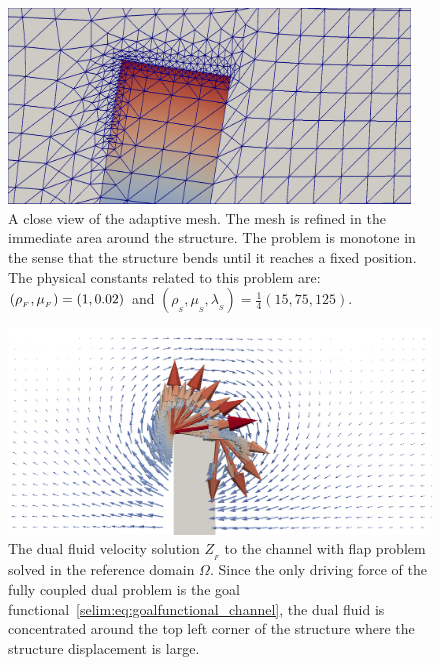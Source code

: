 \begin{figure}
  \label{selim:fig:channel_zoom_mesh}
  \caption{A close view of the adaptive mesh. The mesh is refined in
    the immediate area around the structure. The problem is monotone
    in the sense that the structure bends until it reaches a fixed
    position. The physical constants related to this problem are:
    $(\rho_{_{F}},\mu_{_{F}}) = (1, 0.02)$ and $(\rho_{_{S}},\mu_{_{S}},
    \lambda_{_{S}}) = \tfrac{1}{4}(15, 75, 125)$.}
  \includegraphics[width=0.95\textwidth]{chapters/selim/png/channel_test_zoom.png}
\end{figure}
\begin{figure}
  \label{selim:fig:dual_channel_ZF}
\caption{The dual fluid velocity solution  $Z_{_{F}}$  to the channel with flap problem solved in
  the reference domain $\Omega$. Since the only
  driving force of the fully coupled dual problem is the goal
  functional~\ref{selim:eq:goalfunctional_channel}, the dual fluid is
  concentrated around the top left corner of the structure where the
  structure displacement is large.}
\includegraphics[width=1.0\textwidth]{chapters/selim/png/channelZF.png}
\end{figure}
